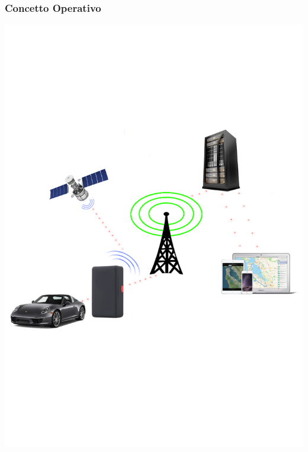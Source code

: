 \documentclass[a4paper,12pt]{beamer}
\begin{document}
\begin{frame}
\frametitle{Concetto Operativo}
\includegraphics[trim={0 6cm 0 6cm}, clip, scale=.5]{../Vision/Concetto2.png}
\end{frame}

\pagebreak
\end{document}
